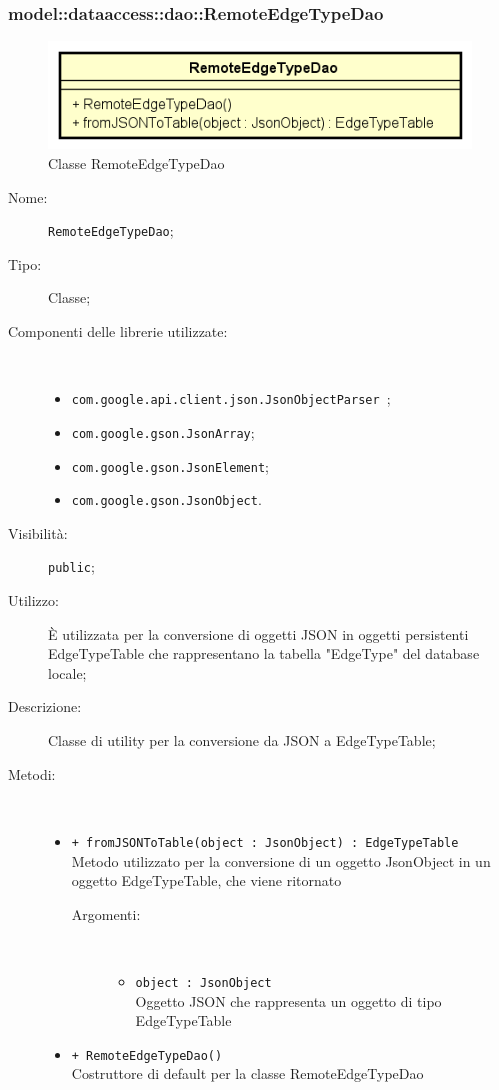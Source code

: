 \documentclass[../DefinizioneDiProdotto.tex]{subfiles}
\begin{document}
\subsubsection{model::dataaccess::dao::RemoteEdgeTypeDao}

    \begin{figure}[H]
        \centering
        \includegraphics{img/RemoteEdgeTypeDao.png}
        \caption{Classe RemoteEdgeTypeDao}\label{fig:model::dataaccess::dao::RemoteEdgeTypeDao} 
    \end{figure}
    \begin{description}
\item[Nome:] \texttt{RemoteEdgeTypeDao};
\item[Tipo:] Classe;
\item[Componenti delle librerie utilizzate:] \
\begin{itemize}
\item \texttt{com.google.api.client.json.JsonObjectParser
};

\item \texttt{com.google.gson.JsonArray};

\item \texttt{com.google.gson.JsonElement};

\item \texttt{com.google.gson.JsonObject}.

\end{itemize}
\item[Visibilità:] \texttt{public};
\item[Utilizzo:] È utilizzata per la conversione di oggetti JSON in oggetti persistenti EdgeTypeTable che rappresentano la tabella "EdgeType" del database locale;
\item[Descrizione:] Classe di utility per la conversione da JSON a EdgeTypeTable;
\item[Metodi:] \
\begin{itemize}
\item \texttt{+ fromJSONToTable(object : JsonObject) : EdgeTypeTable}\\
Metodo utilizzato per la conversione di un oggetto JsonObject in un oggetto EdgeTypeTable, che viene ritornato
 \begin{description}
\item[Argomenti:] \
\begin{itemize}
\item \texttt{object : JsonObject}\\
Oggetto JSON che rappresenta un oggetto di tipo EdgeTypeTable\end{itemize}
\end{description}
\item \texttt{+ RemoteEdgeTypeDao()}\\
Costruttore di default per la classe RemoteEdgeTypeDao
 \end{itemize}
\end{description}
\end{document}
